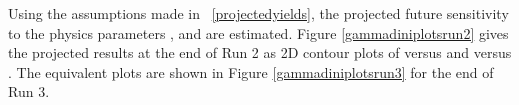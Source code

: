 \begin{table}
\caption{Yields and projected yields for different data-taking periods of the LHC. The entries in bold are projected yields, whereas the other entries refer to data used in this thesis. Projected results are justified in the text, with information taken from Ref.~\cite{CERN-LHCC-2014-016}.}
\label{projectedyields}
\end{table}


Using the assumptions made in \tab~\ref{projectedyields}, the projected future sensitivity to the physics parameters \rb, \deltab and \Pgamma are estimated. Figure \ref{gammadiniplotsrun2} gives the projected results at the end of Run 2 as 2D contour plots of \rb versus \Pgamma and \deltab versus \Pgamma. The equivalent plots are shown in Figure \ref{gammadiniplotsrun3} for the end of Run 3. 

